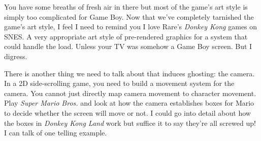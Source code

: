 \documentclass{book}
\begin{document}
\begin{minipage}{0.45\linewidth}\end{minipage}\vspace{2pt}
\begin{minipage}{0.45\linewidth}\end{minipage}\vspace{2pt}
\begin{minipage}{0.45\linewidth}\end{minipage}\vspace{2pt}
\begin{minipage}{0.45\linewidth}\end{minipage}\vspace{2pt}
\begin{minipage}{0.45\linewidth}\end{minipage}
\par\justifying
You have some breaths of fresh air in there but most of the game’s art style is simply too complicated for Game Boy. Now that we’ve completely tarnished the game’s art style, I feel I need to remind you I love Rare’s \emph{Donkey Kong} games on SNES. A very appropriate art style of pre-rendered graphics for a system that could handle the load. Unless your TV was somehow a Game Boy screen. But I digress.\par
There is another thing we need to talk about that induces ghosting: the camera. In a 2D side-scrolling game, you need to build a movement system for the camera. You cannot just directly map camera movement to character movement. Play \emph{Super Mario Bros.} and look at how the camera establishes boxes for Mario to decide whether the screen will move or not. I could go into detail about how the boxes in \emph{Donkey Kong Land} work but suffice it to say they’re all screwed up! I can talk of one telling example.\par
\end{document}
